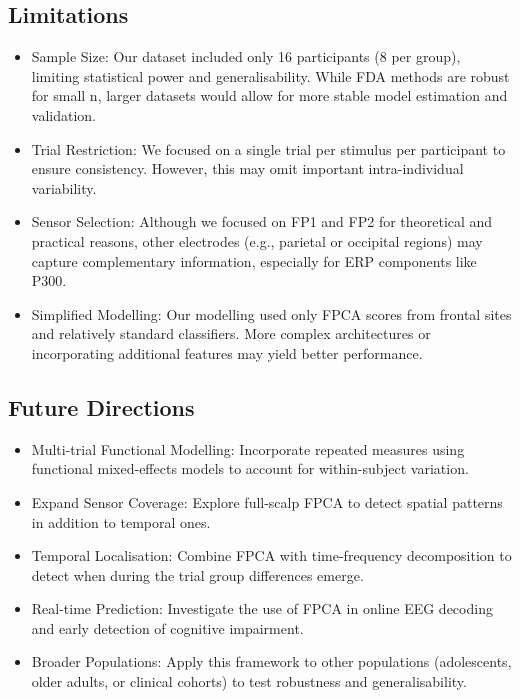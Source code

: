 \documentclass{article}
\begin{document}
\subsection{Limitations}\label{limitations}

\begin{itemize}
\item
  Sample Size: Our dataset included only 16 participants (8 per group),
  limiting statistical power and generalisability. While FDA methods are
  robust for small n, larger datasets would allow for more stable model
  estimation and validation.
\item
  Trial Restriction: We focused on a single trial per stimulus per
  participant to ensure consistency. However, this may omit important
  intra-individual variability.
\item
  Sensor Selection: Although we focused on FP1 and FP2 for theoretical
  and practical reasons, other electrodes (e.g., parietal or occipital
  regions) may capture complementary information, especially for ERP
  components like P300.
\item
  Simplified Modelling: Our modelling used only FPCA scores from frontal
  sites and relatively standard classifiers. More complex architectures
  or incorporating additional features may yield better performance.
\end{itemize}

\subsection{Future Directions}\label{future-directions}

\begin{itemize}
\item
  Multi-trial Functional Modelling: Incorporate repeated measures using
  functional mixed-effects models to account for within-subject
  variation.
\item
  Expand Sensor Coverage: Explore full-scalp FPCA to detect spatial
  patterns in addition to temporal ones.
\item
  Temporal Localisation: Combine FPCA with time-frequency decomposition
  to detect when during the trial group differences emerge.
\item
  Real-time Prediction: Investigate the use of FPCA in online EEG
  decoding and early detection of cognitive impairment.
\item
  Broader Populations: Apply this framework to other populations
  (adolescents, older adults, or clinical cohorts) to test robustness
  and generalisability.
\end{itemize}
\end{document}
